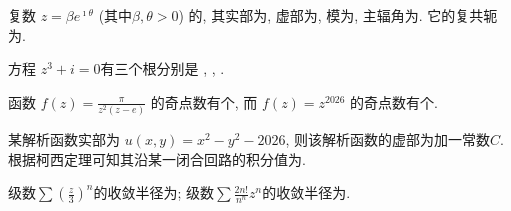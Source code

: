 \documentclass{njustexam}
\begin{document}
\renewcommand{\course}{数学物理方法}                          %
\renewcommand{\duration}{120}                                            %
\renewcommand{\credit}{5}                                                   %
\renewcommand{\syllabus}{11044102}                               %
\renewcommand{\fullmark}{100}                                            %
\renewcommand{\composer}{罗凯}            %
\renewcommand{\composedate}{2026年2月}                   %
\renewcommand{\validator}{}                                        %
\renewcommand{\coursetype}{1}                                            %
\renewcommand{\exammethod}{1}                                         %
\renewcommand{\testpaper}{B}                                              %

\makehead %



\begin{problem}
  复数 $z = \beta e^{\imath \theta}$ (其中$\beta, \theta  > 0$) 的, 
  其实部为\fillout{$\beta \cos \theta$}, 虚部为\fillout{$\beta \sin \theta$}, 
  模为\fillout{$\beta$}, 主辐角为\fillout{$\theta$}. 
 它的复共轭为.
  \end{problem}
  
  \begin{problem}
  方程 $z^3 +  i  = 0$有三个根分别是
  , , .
  \end{problem}
  
  \begin{problem}
  函数 $f(z)=\frac{\pi}{z^2 (z-e)}$ 的奇点数有个, 而 $f(z)=z^{2026}$ 的奇点数有个. 
  \end{problem}
  
  \begin{problem}
  某解析函数实部为 $u(x, y) = x^2 - y^2 - 2026$, 则该解析函数的虚部为加一常数$C$.
  根据柯西定理可知其沿某一闭合回路的积分值为. 
  \end{problem}
  
  \begin{problem}
  级数$\sum (\frac{z}{3})^n$的收敛半径为;
  级数$\sum \frac{2 n !}{n^n} z^n$的收敛半径为. 
 \end{problem}
\end{document}
